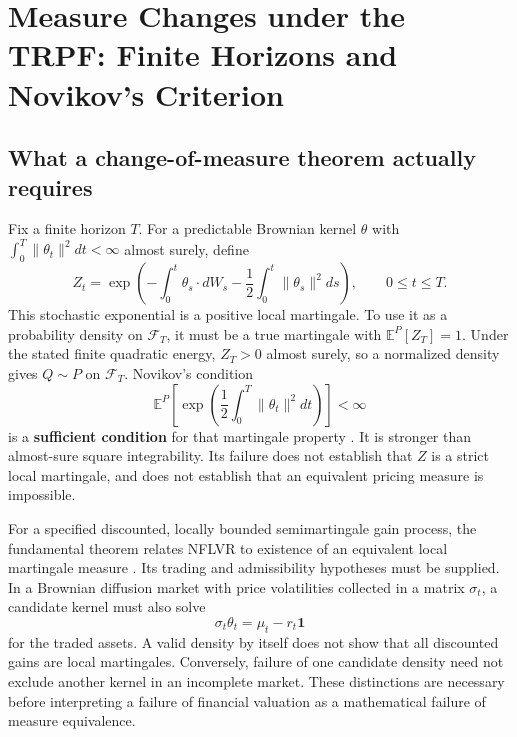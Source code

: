 \documentclass[11pt,letterpaper]{report}
\begin{document}
\section{Measure Changes under the TRPF: Finite Horizons and Novikov's Criterion}
\label{sec:measure-correction}
\subsection{What a change-of-measure theorem actually requires}
Fix a finite horizon $T$. For a predictable Brownian kernel $\theta$
with $\int_0^T\|\theta_t\|^2dt<\infty$ almost surely, define
\[
 Z_t=\exp\left(-\int_0^t\theta_s\cdot dW_s
                 -\frac12\int_0^t\|\theta_s\|^2ds\right),
 \qquad 0\le t\le T.
\]
This stochastic exponential is a positive local martingale. To use it
as a probability density on $\mathcal F_T$, it must be a true
martingale with $\mathbb E^P[Z_T]=1$. Under the stated finite quadratic
energy, $Z_T>0$ almost surely, so a normalized density gives
$Q\sim P$ on $\mathcal F_T$. Novikov's condition
\[
 \mathbb E^P\left[
       \exp\left(\frac12\int_0^T\|\theta_t\|^2dt\right)\right]<\infty
\]
is a \textbf{sufficient condition} for that martingale property
\cite{KS-correction}. It is stronger than almost-sure square
integrability. Its failure does not establish that $Z$ is a strict
local martingale, and does not establish that an equivalent pricing
measure is impossible.

For a specified discounted, locally bounded semimartingale gain process,
the fundamental theorem relates NFLVR to existence of an equivalent
local martingale measure \cite{DS-correction}. Its trading and
admissibility hypotheses must be supplied. In a Brownian diffusion
market with price volatilities collected in a matrix $\sigma_t$,
a candidate kernel must also solve
\[
 \sigma_t\theta_t=\mu_t-r_t\mathbf 1
\]
for the traded assets. A valid density by itself does not show that
all discounted gains are local martingales. Conversely, failure of one
candidate density need not exclude another kernel in an incomplete
market. These distinctions are necessary before interpreting a
failure of financial valuation as a mathematical failure of measure
equivalence.
\end{document}
